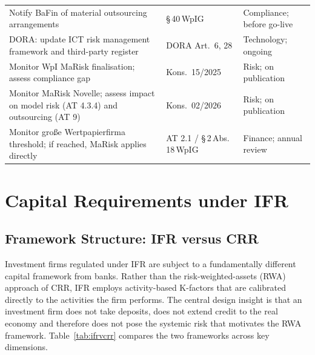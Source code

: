 \documentclass[12pt,a4paper]{report}
\begin{document}
\begin{longtable}{@{}L{6cm}L{3cm}L{4cm}@{}}
Notify BaFin of material outsourcing arrangements & \S\,40\,WpIG & Compliance; before go-live \\[3pt]
DORA: update ICT risk management framework and third-party register & DORA Art.\ 6, 28 & Technology; ongoing \\[3pt]
Monitor WpI MaRisk finalisation; assess compliance gap & Kons.\ 15/2025 & Risk; on publication \\[3pt]
Monitor MaRisk Novelle; assess impact on model risk (AT 4.3.4) and outsourcing (AT 9) & Kons.\ 02/2026 & Risk; on publication \\[3pt]
Monitor gro{\ss}e Wertpapierfirma threshold; if reached, MaRisk applies directly & AT 2.1 / \S\,2\,Abs.\,18\,WpIG & Finance; annual review \\
\end{longtable}

\chapter{Capital Requirements under IFR}

\section{Framework Structure: IFR versus CRR}

Investment firms regulated under IFR are subject to a fundamentally different capital
framework from banks. Rather than the risk-weighted-assets (RWA) approach of CRR, IFR
employs activity-based K-factors that are calibrated directly to the activities the firm
performs. The central design insight is that an investment firm does not take deposits,
does not extend credit to the real economy and therefore does not pose the systemic risk
that motivates the RWA framework. Table~\ref{tab:ifrvcrr} compares the two frameworks
across key dimensions.
\end{document}
